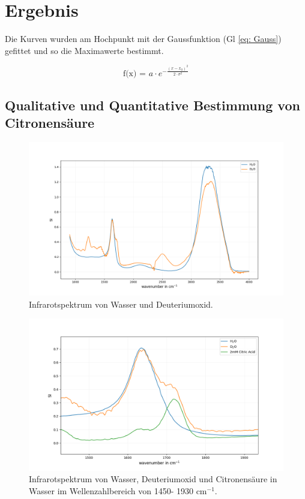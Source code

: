 \documentclass[10pt,a4paper]{article}
\begin{document}
	
	
	\section{Ergebnis}
	Die Kurven wurden am Hochpunkt mit der Gaussfunktion (Gl \ref{eq: Gauss}) gefittet und so die Maximawerte bestimmt.

	\begin{equation}\label{eq: Gauss}
		\text{f(x) = } a \cdot e^{-\frac{(x-x_0)^2}{2 \cdot \sigma^2}}
	\end{equation}
	
	\subsection{Qualitative und Quantitative Bestimmung von Citronensäure}
	
		\begin{figure}[H]
			\centering
			\includegraphics[scale=0.55]{Onlywater.png}
			\caption{Infrarotspektrum von Wasser und Deuteriumoxid.}
			\label{fig:water}
		\end{figure}
	
		\begin{figure}[H]
			\centering
			\includegraphics[scale=0.60]{water_citricacid_upclose.png}
			\caption{Infrarotspektrum von Wasser, Deuteriumoxid und Citronensäure in Wasser im Wellenzahlbereich von 1450- 1930 cm$^{-1}$.}
			\label{fig:water_citricacid}
		\end{figure}
		
\end{document}
